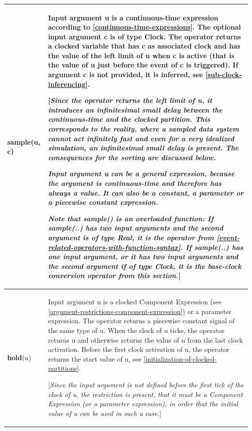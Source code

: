 \documentclass[10pt,a4paper]{report}
\begin{document}
\begin{longtable}[]{@{}ll@{}}
\endhead
\hline
\textbf{sample}(u, c) &
Input argument u is a continuous-time expression according to 
\ref{continuous-time-expressions}. The optional input argument c is of type Clock. The operator
returns a clocked variable that has c as associated clock and has the
value of the left limit of u when c is active (that is the value of u
just before the event of c is triggered). If argument c is not provided,
it is inferred, see \ref{sub-clock-inferencing}.

{[}\emph{Since the operator returns the left limit of u, it introduces
an infinitesimal small delay between the continuous-time and the clocked
partition. This corresponds to the reality, where a sampled data system
cannot act infinitely fast and even for a very idealized simulation, an
infinitesimal small delay is present. The consequences for the sorting
are discussed below.}

\emph{Input argument u can be a general expression, because the argument
is continuous-time and therefore has always a value. It can also be a
constant, a parameter or a piecewise constant expression. }

\emph{Note that \textbf{sample}() is an overloaded function: If
\textbf{sample}(..) has two input arguments and the second argument is
of type Real, it is the operator from \ref{event-related-operators-with-function-syntax}. If
\textbf{sample}(..) has one input argument, or it has two input
arguments and the second argument if of type Clock, it is the base-clock
conversion operator from this section.}{]}\\ \hline
\textbf{hold}(u) &
Input argument u is a clocked Component Expression (see \ref{argument-restrictions-component-expression})
or a parameter expression. The operator returns a piecewise constant
signal of the same type of u. When the clock of u ticks, the operator
returns u and otherwise returns the value of u from the last clock
activation. Before the first clock activation of u, the operator returns
the start value of u, see \ref{initialization-of-clocked-partitions}.

{[}\emph{Since the input argument is not defined before the first tick
of the clock of u, the restriction is present, that it must be a
Component Expression (or a parameter expression), in order that the
initial value of u can be used in such a case.}{]}\\ \hline
\end{longtable}
\end{document}

